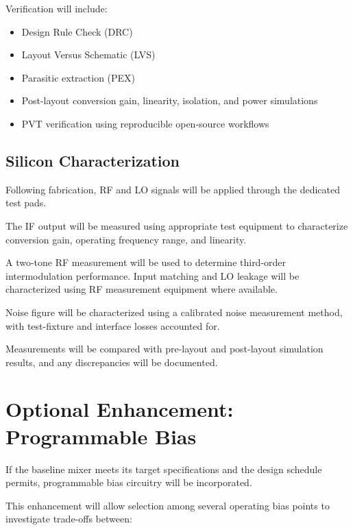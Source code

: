 \documentclass[11pt,letterpaper]{article}
\begin{document}
Verification will include:

\begin{itemize}
    \item Design Rule Check (DRC)

    \item Layout Versus Schematic (LVS)

    \item Parasitic extraction (PEX)

    \item Post-layout conversion gain, linearity,
    isolation, and power simulations

    \item PVT verification using reproducible
    open-source workflows
\end{itemize}


\subsection{Silicon Characterization}

Following fabrication, RF and LO signals will be
applied through the dedicated test pads.

The IF output will be measured using appropriate test
equipment to characterize conversion gain, operating
frequency range, and linearity.

A two-tone RF measurement will be used to determine
third-order intermodulation performance. Input matching
and LO leakage will be characterized using RF measurement
equipment where available.

Noise figure will be characterized using a calibrated
noise measurement method, with test-fixture and interface
losses accounted for.

Measurements will be compared with pre-layout and
post-layout simulation results, and any discrepancies
will be documented.


\section{Optional Enhancement: Programmable Bias}

If the baseline mixer meets its target specifications
and the design schedule permits, programmable bias
circuitry will be incorporated.

This enhancement will allow selection among several
operating bias points to investigate trade-offs between:
\end{document}
